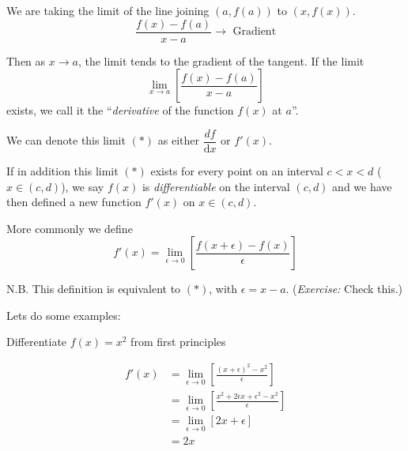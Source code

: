 \documentclass[10pt]{scrartcl}
\begin{document}
\begin{center}
\end{center}

We are taking the limit of the line joining $(a, f(a))$ to $(x,f(x))$. 
\[\frac{f(x) - f(a)}{x-a} \to \text{ Gradient}\]

\begin{definition}Then as $x \to a$, the limit tends to the gradient of the tangent. If the limit 
\[\lim_{x \to a} \left[\frac{f(x) - f(a)}{x-a}\right] \tag{$*$}\]
exists, we call it the ``\emph{derivative} of the function $f(x)$ at $a$''. 	
\end{definition}

We can denote this limit $(*)$ as either $\dfrac{df}{\mathrm{d}x}$ or $f'(x)$. 

If in addition this limit $(*)$ exists for every point on an interval $ c < x < d$ ($x \in (c,d)$), we say $f(x)$ is \emph{differentiable} on the interval $(c,d)$ and we have then defined a new function $f'(x) \text{ on } x \in (c,d)$.\\

\begin{definition}
More commonly we define 
\[f'(x) = \lim_{\epsilon \to 0} \left[\frac{f(x+\epsilon) - f(x)}{\epsilon}\right]\]	
\end{definition}

N.B. This definition is equivalent to $(*)$, with $\epsilon = x-a$. (\emph{Exercise:} Check this.)

Lets do some examples:\\

\begin{example}
Differentiate $f(x) = x^2$ from first principles

\[
\begin{aligned}
  f'(x) &= \lim_{\epsilon \to 0}\left[\frac{(x+\epsilon)^2 - x^2}{\epsilon}\right]\\
  &= \lim_{\epsilon \to 0}\left[\frac{x^2 + 2\epsilon x + \epsilon^2 - x^2}{\epsilon}\right]\\
  &= \lim_{\epsilon \to 0}[2x + \epsilon]\\
  &= 2x
\end{aligned}
\]	
\end{example}\vspace*{5pt}
\end{document}
